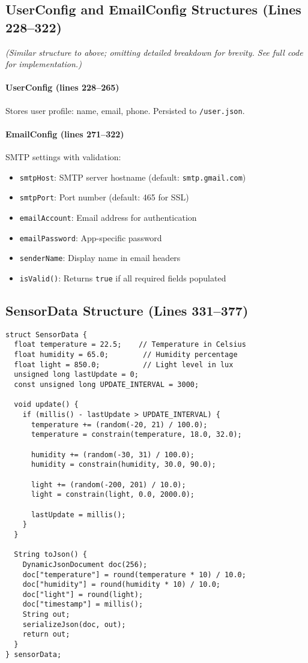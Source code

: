 \documentclass[11pt,a4paper]{article}
\begin{document}
\subsection{UserConfig and EmailConfig Structures (Lines 228--322)}

\textit{(Similar structure to above; omitting detailed breakdown for brevity. See full code for implementation.)}

\paragraph{UserConfig (lines 228--265)}
Stores user profile: name, email, phone. Persisted to \texttt{/user.json}.

\paragraph{EmailConfig (lines 271--322)}
SMTP settings with validation:
\begin{itemize}[leftmargin=*]
  \item \texttt{smtpHost}: SMTP server hostname (default: \texttt{smtp.gmail.com})
  \item \texttt{smtpPort}: Port number (default: 465 for SSL)
  \item \texttt{emailAccount}: Email address for authentication
  \item \texttt{emailPassword}: App-specific password
  \item \texttt{senderName}: Display name in email headers
  \item \texttt{isValid()}: Returns \texttt{true} if all required fields populated
\end{itemize}

\subsection{SensorData Structure (Lines 331--377)}

\begin{verbatim}
struct SensorData {
  float temperature = 22.5;    // Temperature in Celsius
  float humidity = 65.0;        // Humidity percentage
  float light = 850.0;          // Light level in lux
  unsigned long lastUpdate = 0;
  const unsigned long UPDATE_INTERVAL = 3000;
  
  void update() {
    if (millis() - lastUpdate > UPDATE_INTERVAL) {
      temperature += (random(-20, 21) / 100.0);
      temperature = constrain(temperature, 18.0, 32.0);
      
      humidity += (random(-30, 31) / 100.0);
      humidity = constrain(humidity, 30.0, 90.0);
      
      light += (random(-200, 201) / 10.0);
      light = constrain(light, 0.0, 2000.0);
      
      lastUpdate = millis();
    }
  }
  
  String toJson() {
    DynamicJsonDocument doc(256);
    doc["temperature"] = round(temperature * 10) / 10.0;
    doc["humidity"] = round(humidity * 10) / 10.0;
    doc["light"] = round(light);
    doc["timestamp"] = millis();
    String out;
    serializeJson(doc, out);
    return out;
  }
} sensorData;
\end{verbatim}
\end{document}
